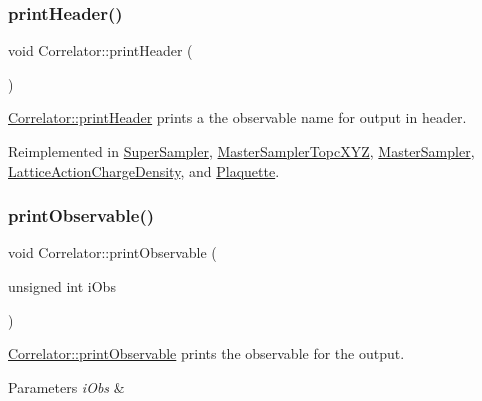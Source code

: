 \subsubsection{\texorpdfstring{printHeader()}{printHeader()}}
{\footnotesize\ttfamily void Correlator\+::print\+Header (\begin{DoxyParamCaption}{ }\end{DoxyParamCaption})\hspace{0.3cm}{\ttfamily [virtual]}}



\mbox{\hyperlink{class_correlator_ac7c5a07d7cbee97c417a1659b93083b2}{Correlator\+::print\+Header}} prints a the observable name for output in header. 



Reimplemented in \mbox{\hyperlink{class_super_sampler_a9bedfcc40a22c48378a6ed63f64e6957}{Super\+Sampler}}, \mbox{\hyperlink{class_master_sampler_topc_x_y_z_a630a504ecbf3ceb517ebeefb39c3faff}{Master\+Sampler\+Topc\+X\+YZ}}, \mbox{\hyperlink{class_master_sampler_a51b207672764c100e1ae258fd2e33fcf}{Master\+Sampler}}, \mbox{\hyperlink{class_lattice_action_charge_density_a2a7a806862f23975161316a37f47f22e}{Lattice\+Action\+Charge\+Density}}, and \mbox{\hyperlink{class_plaquette_aef85b75fe7ce4780eeacf96c5da1b4b4}{Plaquette}}.

\mbox{\label{class_correlator_a15744ddb9f2b71fff34ac762d101df38}} 
\subsubsection{\texorpdfstring{printObservable()}{printObservable()}}
{\footnotesize\ttfamily void Correlator\+::print\+Observable (\begin{DoxyParamCaption}\item[{unsigned int}]{i\+Obs }\end{DoxyParamCaption})\hspace{0.3cm}{\ttfamily [virtual]}}



\mbox{\hyperlink{class_correlator_a15744ddb9f2b71fff34ac762d101df38}{Correlator\+::print\+Observable}} prints the observable for the output. 


\begin{DoxyParams}{Parameters}
{\em i\+Obs} & \\
\hline
\end{DoxyParams}


